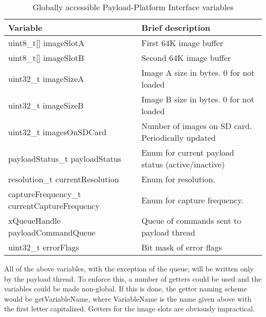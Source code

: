 \documentclass{article}
\begin{document}
\begin{table}
\begin{center}
\caption{Globally accessible Payload-Platform Interface variables}
\begin{tabular}{| l | l |}
    \hline 
    Variable & Brief description \\ \hline
    uint8\_t[] imageSlotA & First 64K image buffer \\ \hline
    uint8\_t[] imageSlotB & Second 64K image buffer \\ \hline
    uint32\_t imageSizeA & Image A size in bytes. 0 for not loaded\\ \hline
    uint32\_t imageSizeB & Image B size in bytes. 0 for not loaded \\ \hline
    uint32\_t imagesOnSDCard & Number of images on SD card. Periodically updated \\ \hline
    payloadStatus\_t payloadStatus & Enum for current payload status (active/inactive) \\ \hline
    resolution\_t currentResolution & Enum for resolution. \\ \hline
    captureFrequency\_t currentCaptureFrequency & Enum for capture frequency. \\ \hline
    xQueueHandle payloadCommandQueue & Queue of commands sent to payload thread \\ \hline
    uint32\_t errorFlags & Bit mask of error flags \\ \hline
\end{tabular}
\end{center}
\end{table}

All of the above variables, with the exception of the queue,
will be written only by the payload thread. To enforce
this, a number of getters could be used and the variables could be made non-global.
If this is done, the getter naming scheme would be getVariableName, where
VariableName is the name given above with the first letter capitalized.
Getters for the image slots are obviously impractical.
\end{document}
